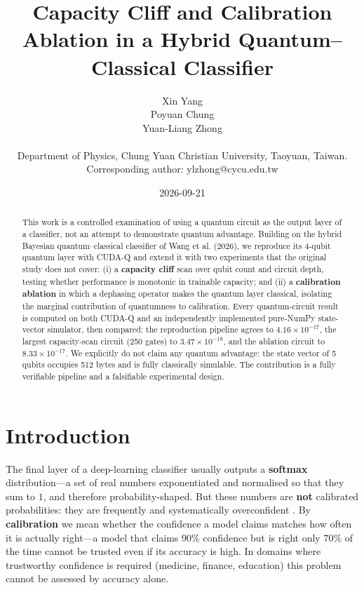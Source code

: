\documentclass{article}
\title{Capacity Cliff and Calibration Ablation in a Hybrid Quantum--Classical Classifier}
\author{Xin Yang \\
  \And
Poyuan Chung \\
  \And
Yuan-Liang Zhong \\
  \parbox{0.86\textwidth}{\centering Department of Physics, Chung Yuan Christian University, Taoyuan, Taiwan.\\Corresponding author: ylzhong@cycu.edu.tw}}
\date{2026-09-21}
\begin{document}
\maketitle

\begin{abstract}
This work is a controlled examination of using a quantum circuit as the
output layer of a classifier, not an attempt to demonstrate quantum
advantage. Building on the hybrid Bayesian quantum--classical classifier
of Wang et al. (2026), we reproduce its 4-qubit quantum layer with
CUDA-Q and extend it with two experiments that the original study does
not cover: (i) a \textbf{capacity cliff} scan over qubit count and
circuit depth, testing whether performance is monotonic in trainable
capacity; and (ii) a \textbf{calibration ablation} in which a dephasing
operator makes the quantum layer classical, isolating the marginal
contribution of quantumness to calibration. Every quantum-circuit result
is computed on both CUDA-Q and an independently implemented pure-NumPy
state-vector simulator, then compared: the reproduction pipeline agrees
to \(4.16 \times 10^{- 17}\), the largest capacity-scan circuit (250
gates) to \(3.47 \times 10^{- 18}\), and the ablation circuit to
\(8.33 \times 10^{- 17}\). We explicitly do not claim any quantum
advantage: the state vector of 5 qubits occupies 512 bytes and is fully
classically simulable. The contribution is a fully verifiable pipeline
and a falsifiable experimental design.
\end{abstract}

\section{Introduction}

The final layer of a deep-learning classifier usually outputs a
\textbf{softmax} distribution---a set of real numbers exponentiated and
normalised so that they sum to \(1\), and therefore probability-shaped.
But these numbers are \textbf{not} calibrated probabilities: they are
frequently and systematically overconfident \cite{guo2017}. By
\textbf{calibration} we mean whether the confidence a model claims
matches how often it is actually right---a model that claims \(90\%\)
confidence but is right only \(70\%\) of the time cannot be trusted even
if its accuracy is high. In domains where trustworthy confidence is
required (medicine, finance, education) this problem cannot be assessed
by accuracy alone.
\end{document}

